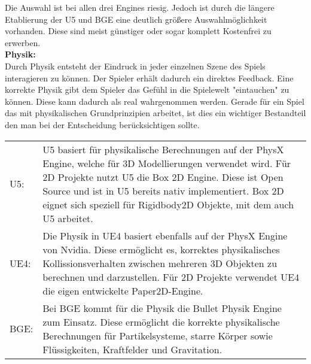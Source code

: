 Die Auswahl ist bei allen drei Engines riesig. Jedoch ist durch die längere Etablierung der \ac{U5} und \ac{BGE} eine deutlich größere Auswahlmöglichkeit vorhanden. Diese sind meist günstiger oder sogar komplett Kostenfrei zu erwerben.\\

\textbf{Physik:}\\
Durch Physik entsteht der Eindruck in jeder einzelnen Szene des Spiels interagieren zu können. Der Spieler erhält dadurch ein direktes Feedback. Eine korrekte Physik gibt dem Spieler das Gefühl in die Spielewelt "eintauchen" zu können. Diese kann dadurch als real wahrgenommen werden. Gerade für ein Spiel das mit physikalischen Grundprinzipien arbeitet, ist dies ein wichtiger Bestandteil den man bei der Entscheidung berücksichtigen sollte. 
\begin{table}[H]
\centering
\begin{tabular}{lp{14.5cm}}

\ac{U5}: &
\ac{U5} basiert für physikalische Berechnungen auf der PhysX Engine, welche für 3D Modellierungen verwendet wird. Für 2D Projekte nutzt \ac{U5} die Box 2D Engine. Diese ist Open Source und ist in \ac{U5} bereits nativ implementiert. Box 2D eignet sich speziell für Rigidbody2D Objekte, mit dem auch \ac{U5} arbeitet.\\
\ac{UE4}:& Die Physik in \ac{UE4} basiert ebenfalls auf der PhysX Engine von Nvidia. Diese ermöglicht es, korrektes physikalisches Kollissionsverhalten zwischen mehreren 3D Objekten zu berechnen und darzustellen. Für 2D Projekte verwendet \ac{UE4} die eigen entwickelte Paper2D-Engine. \\

\ac{BGE}:&
Bei \ac{BGE} kommt für die Physik die Bullet Physik Engine zum Einsatz. Diese ermöglicht die korrekte physikalische Berechnungen für Partikelsysteme, starre Körper sowie Flüssigkeiten, Kraftfelder und Gravitation.
\end{tabular}
\end{table}


